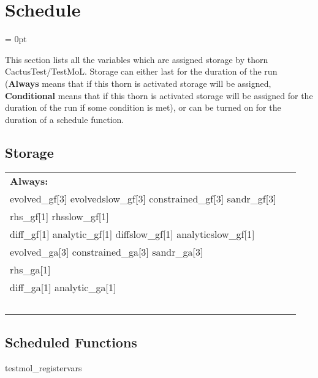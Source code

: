 
\section{Schedule} 


\parskip = 0pt


\noindent This section lists all the variables which are assigned storage by thorn CactusTest/TestMoL.  Storage can either last for the duration of the run ({\bf Always} means that if this thorn is activated storage will be assigned, {\bf Conditional} means that if this thorn is activated storage will be assigned for the duration of the run if some condition is met), or can be turned on for the duration of a schedule function.


\subsection*{Storage}

\hspace{5mm}

 \begin{tabular*}{160mm}{ll} 

{\bf Always:}&  ~ \\ 
 evolved\_gf[3] evolvedslow\_gf[3] constrained\_gf[3] sandr\_gf[3] & ~\\ 
 rhs\_gf[1] rhsslow\_gf[1] & ~\\ 
 diff\_gf[1] analytic\_gf[1] diffslow\_gf[1] analyticslow\_gf[1] & ~\\ 
 evolved\_ga[3] constrained\_ga[3] sandr\_ga[3] & ~\\ 
 rhs\_ga[1] & ~\\ 
 diff\_ga[1] analytic\_ga[1] & ~\\ 
~ & ~\\ 
\end{tabular*} 


\subsection*{Scheduled Functions}
\vspace{5mm}


\hspace{5mm} testmol\_registervars 

\hspace{5mm}{\it register evolved, rhs variables } 


\hspace{5mm}

